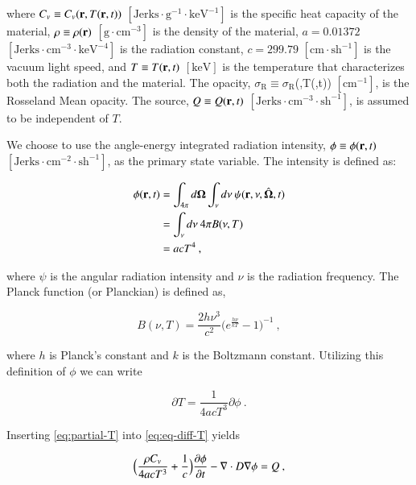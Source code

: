 \documentclass[preprint,12pt]{elsarticle}
\newcommand{\Cv}{\ensuremath{C_{v}}}
\newcommand{\ros}{\ensuremath{\sigma_{\scriptscriptstyle\mathrm{R}}}}
\newcommand{\bOmega}{\ensuremath{\mathbf{\Omega}}}
\begin{document}
where $\Cv\equiv\Cv(\ve{r},T(\ve{r},t))$
$[\text{Jerks}\cdot\text{g}^{-1}\cdot\text{keV}^{-1}]$ is the specific
heat capacity of the material, $\rho\equiv\rho(\mathbf{r})$
$[\text{g}\cdot\text{cm}^{-3}]$ is the density of the material,
$a=0.01372$ $[\text{Jerks}\cdot\text{cm}^{-3}\cdot\text{keV}^{-4}]$ is
the radiation constant, $c=299.79$ $[\text{cm}\cdot\text{sh}^{-1}]$ is
the vacuum light speed, and $T\equiv T(\mathbf{r},t)$ $[\text{keV}]$ is
the temperature that characterizes both the radiation and the
material.  The opacity, $\ros\equiv\ros$(,T(,t))
$[\text{cm}^{-1}]$, is the Rosseland Mean opacity.  The source,
$Q\equiv Q(\mathbf{r},t)$
$[\text{Jerks}\cdot\text{cm}^{-3}\cdot\text{sh}^{-1}]$, is assumed to
be independent of $T$.

We choose to use the angle-energy integrated radiation intensity,
$\phi\equiv\phi(\mathbf{r},t)$
$[\text{Jerks}\cdot\text{cm}^{-2}\cdot\text{sh}^{-1}]$, as the primary
state variable.  The intensity is defined as:

\begin{equation}
  \label{eq:lte-phi}
  \begin{split}
    \phi(\ve{r},t) &=
    \int_{4\pi}d\bOmega\int_{\nu}d\nu\:\psi(\ve{r},\nu,\hat{\bOmega},t)
    \\ &= \int_{\nu}d\nu\: 4\pi B(\nu,T) \\ &= acT^{4}\:,
  \end{split}
\end{equation}

where $\psi$ is the angular radiation intensity and $\nu$ is the
radiation frequency.  The Planck function (or Planckian) is defined
as,

\begin{equation}
  B(\nu,T)=\frac{2h\nu^{3}}{c^{2}}\bigl(e^{\frac{h\nu}{kT}} -
  1\bigr)^{-1}\:,
\end{equation}

where $h$ is Planck's constant and $k$ is the Boltzmann constant.
Utilizing this definition of $\phi$ we can write

\begin{equation}
  \label{eq:partial-T}
  \partial T = \frac{1}{4acT^{3}}\partial\phi\:.
\end{equation}

Inserting \eqref{eq:partial-T} into \eqref{eq:eq-diff-T} yields

\begin{equation}
  \label{eq:eq-diff}
  \Bigl(\frac{\rho\Cv}{4acT^{3}} + \frac{1}{c}\Bigr)\pder{\phi}{t} -
  \nabla\cdot D\grad{\phi} = Q\:,
\end{equation}
\end{document}
